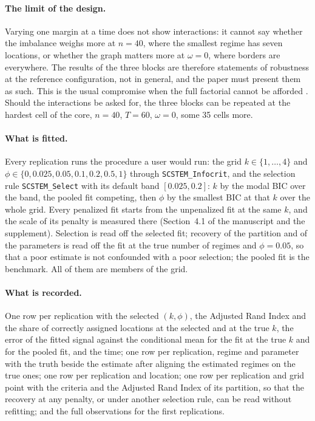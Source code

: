 \documentclass[11pt]{article}
\begin{document}
\paragraph{The limit of the design.} Varying one margin at a time does not show interactions: it cannot say whether the imbalance weighs more at $n = 40$, where the smallest regime has seven locations, or whether the graph matters more at $\omega = 0$, where borders are everywhere. The results of the three blocks are therefore statements of robustness at the reference configuration, not in general, and the paper must present them as such. This is the usual compromise when the full factorial cannot be afforded \citep{MorrisWhiteCrowther2019}. Should the interactions be asked for, the three blocks can be repeated at the hardest cell of the core, $n = 40$, $T = 60$, $\omega = 0$, some 35 cells more.

\paragraph{What is fitted.} Every replication runs the procedure a user would run: the grid $k \in \{1,\dots,4\}$ and $\phi \in \{0, 0.025, 0.05, 0.1, 0.2, 0.5, 1\}$ through \texttt{SCSTEM\_Infocrit}, and the selection rule \texttt{SCSTEM\_Select} with its default band $[0.025, 0.2]$: $k$ by the modal BIC over the band, the pooled fit competing, then $\phi$ by the smallest BIC at that $k$ over the whole grid. Every penalized fit starts from the unpenalized fit at the same $k$, and the scale of its penalty is measured there (Section~4.1 of the manuscript and the supplement). Selection is read off the selected fit; recovery of the partition and of the parameters is read off the fit at the true number of regimes and $\phi = 0.05$, so that a poor estimate is not confounded with a poor selection; the pooled fit is the benchmark. All of them are members of the grid.

\paragraph{What is recorded.} One row per replication with the selected $(k, \phi)$, the Adjusted Rand Index and the share of correctly assigned locations at the selected and at the true $k$, the error of the fitted signal against the conditional mean for the fit at the true $k$ and for the pooled fit, and the time; one row per replication, regime and parameter with the truth beside the estimate after aligning the estimated regimes on the true ones; one row per replication and location; one row per replication and grid point with the criteria and the Adjusted Rand Index of its partition, so that the recovery at any penalty, or under another selection rule, can be read without refitting; and the full observations for the first replications.
\end{document}
